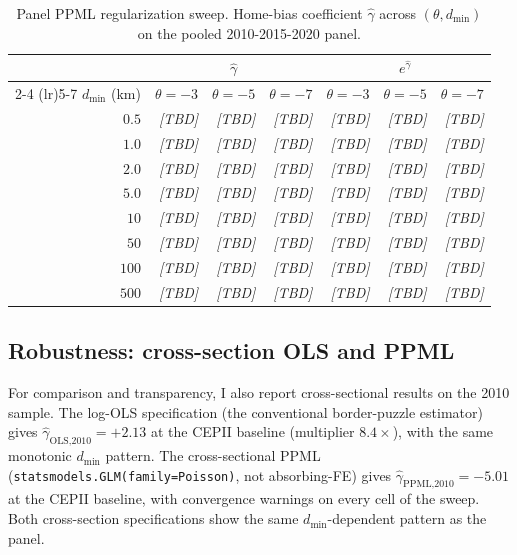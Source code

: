 \begin{table}[h]
\centering
\small
\caption{Panel PPML regularization sweep. Home-bias coefficient
$\hat{\gamma}$ across $(\theta, d_{\min})$ on the pooled
2010-2015-2020 panel.\label{tab:panel-sweep}}
\begin{tabular}{r r r r r r r}
\toprule
& \multicolumn{3}{c}{$\hat{\gamma}$} & \multicolumn{3}{c}{$e^{\hat{\gamma}}$} \\
\cmidrule(lr){2-4} \cmidrule(lr){5-7}
$d_{\min}$ (km) & $\theta = -3$ & $\theta = -5$ & $\theta = -7$ & $\theta = -3$ & $\theta = -5$ & $\theta = -7$ \\
\midrule
$0.5$ & \emph{[TBD]} & \emph{[TBD]} & \emph{[TBD]} & \emph{[TBD]} & \emph{[TBD]} & \emph{[TBD]} \\
$1.0$ & \emph{[TBD]} & \emph{[TBD]} & \emph{[TBD]} & \emph{[TBD]} & \emph{[TBD]} & \emph{[TBD]} \\
$2.0$ & \emph{[TBD]} & \emph{[TBD]} & \emph{[TBD]} & \emph{[TBD]} & \emph{[TBD]} & \emph{[TBD]} \\
$5.0$ & \emph{[TBD]} & \emph{[TBD]} & \emph{[TBD]} & \emph{[TBD]} & \emph{[TBD]} & \emph{[TBD]} \\
$10$ & \emph{[TBD]} & \emph{[TBD]} & \emph{[TBD]} & \emph{[TBD]} & \emph{[TBD]} & \emph{[TBD]} \\
$50$ & \emph{[TBD]} & \emph{[TBD]} & \emph{[TBD]} & \emph{[TBD]} & \emph{[TBD]} & \emph{[TBD]} \\
$100$ & \emph{[TBD]} & \emph{[TBD]} & \emph{[TBD]} & \emph{[TBD]} & \emph{[TBD]} & \emph{[TBD]} \\
$500$ & \emph{[TBD]} & \emph{[TBD]} & \emph{[TBD]} & \emph{[TBD]} & \emph{[TBD]} & \emph{[TBD]} \\
\bottomrule
\end{tabular}
\end{table}

\subsection{Robustness: cross-section OLS and PPML}
\label{sec:robustness}

For comparison and transparency, I also report cross-sectional results
on the 2010 sample. The log-OLS specification (the conventional
border-puzzle estimator) gives $\hat{\gamma}_{\text{OLS,2010}} = +2.13$
at the CEPII baseline (multiplier $8.4\times$), with the same monotonic
$d_{\min}$ pattern. The cross-sectional PPML
(\texttt{statsmodels.GLM(family=Poisson)}, not absorbing-FE) gives
$\hat{\gamma}_{\text{PPML,2010}} = -5.01$ at the CEPII baseline, with
convergence warnings on every cell of the sweep. Both cross-section
specifications show the same $d_{\min}$-dependent pattern as the
panel.

